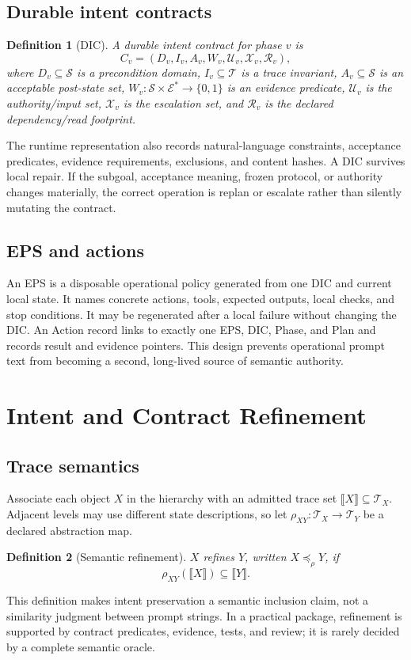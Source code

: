 \documentclass[11pt]{article}
\newtheorem{definition}{Definition}[section]
\newcommand{\State}{\mathcal S}
\newcommand{\Trace}{\mathcal T}
\newcommand{\Evidence}{\mathcal E}
\begin{document}
\subsection{Durable intent contracts}
\begin{definition}[DIC]
A durable intent contract for phase $v$ is
\[
C_v=(D_v,I_v,A_v,W_v,\mathcal U_v,\mathcal X_v,\mathcal R_v),
\]
where $D_v\subseteq\State$ is a precondition domain, $I_v\subseteq\Trace$ is a trace invariant, $A_v\subseteq\State$ is an acceptable post-state set, $W_v:\State\times\Evidence^*\to\{0,1\}$ is an evidence predicate, $\mathcal U_v$ is the authority/input set, $\mathcal X_v$ is the escalation set, and $\mathcal R_v$ is the declared dependency/read footprint.
\end{definition}
The runtime representation also records natural-language constraints, acceptance predicates, evidence requirements, exclusions, and content hashes. A DIC survives local repair. If the subgoal, acceptance meaning, frozen protocol, or authority changes materially, the correct operation is replan or escalate rather than silently mutating the contract.

\subsection{EPS and actions}
An EPS is a disposable operational policy generated from one DIC and current local state. It names concrete actions, tools, expected outputs, local checks, and stop conditions. It may be regenerated after a local failure without changing the DIC. An Action record links to exactly one EPS, DIC, Phase, and Plan and records result and evidence pointers. This design prevents operational prompt text from becoming a second, long-lived source of semantic authority.

\section{Intent and Contract Refinement}
\subsection{Trace semantics}
Associate each object $X$ in the hierarchy with an admitted trace set $\llbracket X\rrbracket\subseteq\Trace_X$. Adjacent levels may use different state descriptions, so let $\rho_{XY}:\Trace_X\to\Trace_Y$ be a declared abstraction map.
\begin{definition}[Semantic refinement]
$X$ refines $Y$, written $X\preceq_{\rho}Y$, if
\[
\rho_{XY}(\llbracket X\rrbracket)\subseteq \llbracket Y\rrbracket.
\]
\end{definition}
This definition makes intent preservation a semantic inclusion claim, not a similarity judgment between prompt strings. In a practical package, refinement is supported by contract predicates, evidence, tests, and review; it is rarely decided by a complete semantic oracle.
\end{document}
